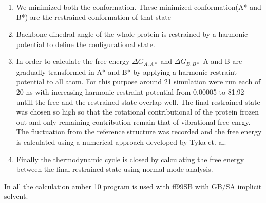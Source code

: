 \documentclass[12pt]{article}
\begin{document}
\begin{enumerate}

\item  We minimized both the conformation. These minimized conformation(A* and B*) are the
    restrained conformation of that state

\item Backbone dihedral angle of the whole protein is restrained by a harmonic potential to define
    the configurational state.

\item  In order to calculate the free energy $\Delta G_{A,A*}$ and  $\Delta G_{B,B*}$ A and B are
    gradually transformed in A* and B* by applying a harmonic restraint potential to all atom. For
    this purpose around 21 simulation were run each of 20 ns with increasing harmonic restraint
    potential from 0.00005 to 81.92 untill the free and the restrained state overlap well. The final
    restrained state was chosen so high so that the rotational contributional of the protein frozen
    out and only remaining contribution remain that of vibrational free enrgy. The fluctuation from
    the reference structure was recorded and the free energy is calculated using a numerical
    approach developed by Tyka et. al.

\item  Finally the thermodynamic cycle is closed by calculating the free energy between the final
    restrained state using normal mode analysis.

\end{enumerate}

In all the calculation amber 10 program is used with ff99SB with GB/SA implicit solvent.
\end{document}

